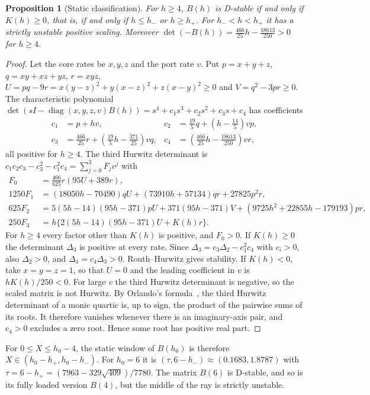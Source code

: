 \documentclass[11pt,a4paper]{article}
\theoremstyle{plain}
\newtheorem{proposition}[theorem]{Proposition}
\theoremstyle{definition}
\theoremstyle{remark}
\newcommand{\diag}{\operatorname{diag}}
\begin{document}
\begin{proposition}[Static classification]\label{prop:Bh}
For $h\ge4$, $B(h)$ is D-stable if and only if $K(h)\ge0$, that is, if and only
if $h\le h_-$ or $h\ge h_+$. For $h_-<h<h_+$ it has a strictly unstable
positive scaling. Moreover $\det(-B(h))=\tfrac{466}{25}h-\tfrac{18613}{250}>0$ for $h\ge4$.
\end{proposition}
\begin{proof}
Let the core rates be $x,y,z$ and the port rate $v$. Put $p=x+y+z$,
$q=xy+xz+yz$, $r=xyz$, $U=pq-9r=x(y-z)^2+y(x-z)^2+z(x-y)^2\ge0$ and
$V=q^2-3pr\ge0$. The characteristic polynomial $\det(sI-\diag(x,y,z,v)B(h))=s^4+c_1s^3+c_2s^2+c_3s+c_4$
has coefficients
\begin{align*}
 c_1&=p+hv,&c_2&=\tfrac{19}{5}q+(h-\tfrac{14}{5})vp,\\
 c_3&=\tfrac{466}{25}r+(\tfrac{19}{5}h-\tfrac{371}{25})vq,&
 c_4&=(\tfrac{466}{25}h-\tfrac{18613}{250})vr,
\end{align*}
all positive for $h\ge4$. The third Hurwitz determinant is
$c_1c_2c_3-c_3^2-c_1^2c_4=\sum_{j=0}^3F_jv^j$ with
\begin{align*}
 F_0&=\tfrac{466}{625}r(95U+389r),\\
 1250F_1&=(18050h-70490)qU+(73910h+57134)qr+27825p^2r,\\
 625F_2&=5(5h-14)(95h-371)pU+371(95h-371)V+(9725h^2+22855h-179193)pr,\\
 250F_3&=h\bigl\{2(5h-14)(95h-371)U+K(h)r\bigr\}.
\end{align*}
For $h\ge4$ every factor other than $K(h)$ is positive, and $F_0>0$. If
$K(h)\ge0$ the determinant $\Delta_3$ is positive at every rate. Since
$\Delta_3=c_3\Delta_2-c_1^2c_4$ with $c_i>0$, also $\Delta_2>0$, and
$\Delta_4=c_4\Delta_3>0$. Routh--Hurwitz gives stability. If $K(h)<0$, take $x=y=z=1$, so
that $U=0$ and the leading coefficient in $v$ is $hK(h)/250<0$. For large $v$
the third Hurwitz determinant is negative, so the scaled matrix is not Hurwitz.
By Orlando's formula~\cite{gantmacher1959}, the third Hurwitz determinant of a monic
quartic is, up to sign, the product of the pairwise sums of its
roots. It therefore vanishes whenever there is an imaginary-axis pair, and
$c_4>0$ excludes a zero root. Hence some root has positive real part.
\end{proof}

For $0\le X\le h_0-4$, the static window of $B(h_0)$ is therefore
$X\in(h_0-h_+,h_0-h_-)$. For
$h_0=6$ it is $(\tau,6-h_-)\approx(0.1683,1.8787)$ with
$\tau=6-h_+=(7963-329\sqrt{409})/7780$. The matrix $B(6)$ is D-stable, and so
is its fully loaded version $B(4)$, but the middle of the ray is strictly
unstable.
\end{document}
